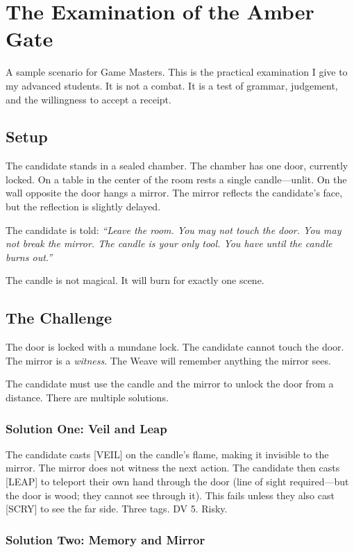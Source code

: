 \chapter{The Examination of the Amber Gate}

A sample scenario for Game Masters. This is the practical examination I give to my advanced students. It is not a combat. It is a test of grammar, judgement, and the willingness to accept a receipt.

\section{Setup}

The candidate stands in a sealed chamber. The chamber has one door, currently locked. On a table in the center of the room rests a single candle---unlit. On the wall opposite the door hangs a mirror. The mirror reflects the candidate's face, but the reflection is slightly delayed.

The candidate is told: \emph{``Leave the room. You may not touch the door. You may not break the mirror. The candle is your only tool. You have until the candle burns out.''}

The candle is not magical. It will burn for exactly one scene.

\section{The Challenge}

The door is locked with a mundane lock. The candidate cannot touch the door. The mirror is a \emph{witness}. The Weave will remember anything the mirror sees.

The candidate must use the candle and the mirror to unlock the door from a distance. There are multiple solutions.

\subsection{Solution One: Veil and Leap}

The candidate casts [VEIL] on the candle's flame, making it invisible to the mirror. The mirror does not witness the next action. The candidate then casts [LEAP] to teleport their own hand through the door (line of sight required---but the door is wood; they cannot see through it). This fails unless they also cast [SCRY] to see the far side. Three tags. DV 5. Risky.

\subsection{Solution Two: Memory and Mirror}


